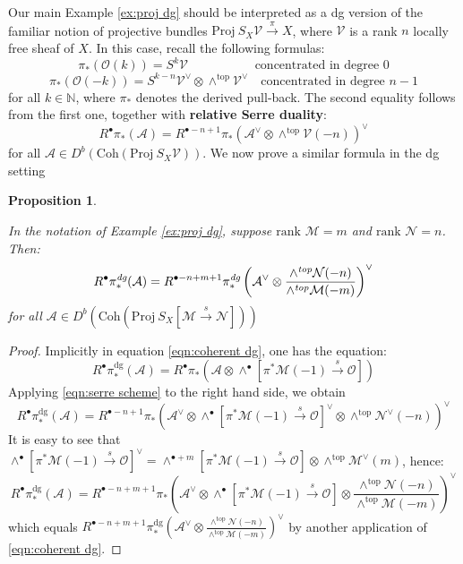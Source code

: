 \documentclass[12pt]{amsart}
\numberwithin{equation}{section}
\newtheorem{proposition}[theorem]{Proposition}
\theoremstyle{definition}
\theoremstyle{remark}
\newcommand{\NN}{\mathbb{N}}
\newcommand{\CA}{\mathcal{A}}
\newcommand{\CM}{\mathcal{M}}
\newcommand{\CN}{\mathcal{N}}
\newcommand{\CO}{\mathcal{O}}
\newcommand{\CT}{\mathcal{T}}
\newcommand{\CV}{\mathcal{V}}
\renewcommand{\1}{\mathbf{1}}
\newcommand{\coh}{\mathrm{Coh}}
\newcommand{\proj}{\mathrm{Proj}}
\newcommand{\dg}{\text{dg}}%
\newcommand{\edg}{\emph{dg}}
\begin{document}
Our main Example \ref{ex:proj dg} should be interpreted as a dg version of the familiar notion of projective bundles $\proj \ S_X\CV \stackrel{\pi}\longrightarrow X$, where $\CV$ is a rank $n$ locally free sheaf of $X$. In this case, recall the following formulas:
$$
\pi_*(\CO(k)) = S^k\CV \qquad \quad \qquad \text{ concentrated in degree 0}
$$
$$
\pi_*(\CO(-k)) = S^{k-n} \CV^\vee \otimes \wedge^{\text{top}} \CV^\vee \quad \text{concentrated in degree }n-1
$$
for all $k\in \NN$, where $\pi_*$ denotes the derived pull-back. The second equality follows from the first one, together with \textbf{relative Serre duality}:
\begin{equation}
\label{eqn:serre scheme}
R^\bullet \pi_*(\CA) = R^{\bullet - n + 1} \pi_{*}(\CA^\vee \otimes \wedge^\text{top} \CV(-n))^\vee
\end{equation}
for all $\CA \in D^b(\coh(\proj \ S_X\CV))$. We now prove a similar formula in the dg setting

\begin{proposition}
\label{prop:canonical} 

In the notation of Example \ref{ex:proj dg}, suppose $\text{rank }\CM = m$ and $\text{rank }\CN = n$. Then:
\begin{equation}
\label{eqn:serre dg scheme}
R^\bullet \pi^\edg_*(\CA) = R^{\bullet - n + m + 1} \pi^\edg_{*}\left(\CA^\vee \otimes \frac {\wedge^\emph{top}\CN(-n)}{\wedge^\emph{top}\CM(-m)}\right)^\vee
\end{equation}
for all $\CA \in D^b(\coh(\proj \ S_X [\CM \stackrel{s}\longrightarrow \CN] ))$

\end{proposition}

\begin{proof} Implicitly in equation \eqref{eqn:coherent dg}, one has the equation:
$$
R^\bullet \pi^\dg_*(\CA) = R^\bullet \pi_* \left(\CA \otimes \wedge^\bullet[\pi^*\CM(-1) \stackrel{s}\rightarrow \CO] \right)
$$
Applying \eqref{eqn:serre scheme} to the right hand side, we obtain
$$
R^\bullet \pi^\dg_*(\CA) = R^{\bullet-n+1} \pi_{*} \left(\CA^\vee \otimes \wedge^\bullet \left[\pi^*\CM(-1) \stackrel{s}\rightarrow \CO \right]^\vee \otimes \wedge^\text{top} \CN^\vee(-n) \right)^\vee
$$
It is easy to see that $\wedge^\bullet \left[\pi^*\CM(-1) \stackrel{s}\rightarrow \CO\right]^\vee = \wedge^{\bullet+m} \left[\pi^*\CM(-1) \stackrel{s}\rightarrow \CO\right] \otimes \wedge^{\text{top}}\CM^\vee(m)$, hence:
$$
R^\bullet \pi^\dg_*(\CA) = R^{\bullet-n+m+1} \pi_{*} \left(\CA^\vee \otimes \wedge^\bullet \left[\pi^*\CM(-1) \stackrel{s}\rightarrow \CO\right] \otimes \frac {\wedge^{\text{top}}\CN(-n)}{\wedge^{\text{top}}\CM(-m)} \right)^\vee
$$
which equals $R^{\bullet - n + m + 1} \pi^\dg_{*}\left(\CA^\vee \otimes \frac {\wedge^\text{top}\CN(-n)}{\wedge^\text{top}\CM(-m)}\right)^\vee$ by another application of \eqref{eqn:coherent dg}. 

\end{proof}
\end{document}
